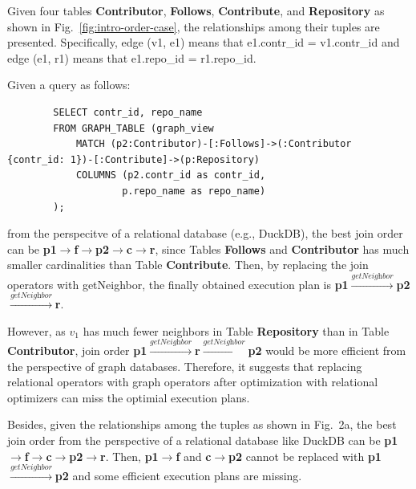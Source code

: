 \begin{example}
    Given four tables \textbf{Contributor}, \textbf{Follows}, \textbf{Contribute}, and \textbf{Repository} as shown in Fig.~\ref{fig:intro-order-case}, the relationships among their tuples are presented.
    Specifically, edge (v1, e1) means that e1.contr\_id = v1.contr\_id and edge (e1, r1) means that e1.repo\_id = r1.repo\_id.

    Given a query as follows:
    \begin{lstlisting}
        SELECT contr_id, repo_name 
        FROM GRAPH_TABLE (graph_view
            MATCH (p2:Contributor)-[:Follows]->(:Contributor {contr_id: 1})-[:Contribute]->(p:Repository)
            COLUMNS (p2.contr_id as contr_id,
                    p.repo_name as repo_name)
        );
    \end{lstlisting}
    from the perspecitve of a relational database (e.g., DuckDB), the best join order can be \textbf{p1$\rightarrow$f$\rightarrow$p2$\rightarrow$c$\rightarrow$r}, since Tables \textbf{Follows} and \textbf{Contributor} has much smaller cardinalities than Table \textbf{Contribute}.
    Then, by replacing the join operators with getNeighbor, the finally obtained execution plan is \textbf{p1$\xrightarrow{\textit{getNeighbor}}$p2$\xrightarrow{\textit{getNeighbor}}$r}.

    However, as $v_1$ has much fewer neighbors in Table \textbf{Repository} than in Table \textbf{Contributor}, join order \textbf{p1$\xrightarrow{\textit{getNeighbor}}$r$\xrightarrow{\textit{getNeighbor}}$p2} would be more efficient from the perspective of graph databases.
    Therefore, it suggests that 
    replacing relational operators with graph operators after optimization with relational optimizers can miss the optimial execution plans.

    Besides, given the relationships among the tuples as shown in Fig.~2a, the best join order from the perspective of a relational database like DuckDB can be \textbf{p1$\rightarrow$f$\rightarrow$c$\rightarrow$p2$\rightarrow$r}.
    Then, \textbf{p1$\rightarrow$f} and \textbf{c$\rightarrow$p2} cannot be replaced with \textbf{p1$\xrightarrow{\textit{getNeighbor}}$p2} and some efficient execution plans are missing.

\end{example}



